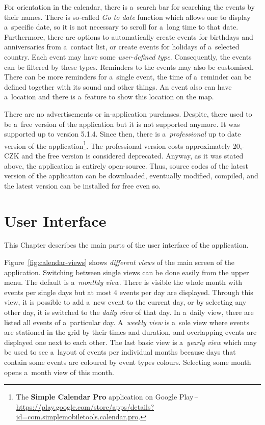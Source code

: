 \documentclass[a4paper, 11pt]{article}
\begin{document}
	For orientation in the calendar, there is a~search bar for searching
	the events by their names. There is so-called \emph{Go to date} function
	which allows one to display a~specific date, so it is not necessary
	to scroll for a~long time to that date. Furthermore, there are
	options to automatically create events for birthdays and anniversaries
	from a~contact list, or create events for holidays of a~selected
	country. Each event may have some \emph{user-defined type}. Consequently,
	the events can be filtered by these types. Reminders to the events
	may also be customised. There can be more reminders for a~single event,
	the time of a~reminder can be defined together with its sound and other
	things. An event also can have a~location and there is a~feature to show
	this location on the map.

	There are no advertisements or in-application purchases. Despite,
	there used to be a~free version of the application but it is not
	supported anymore. It was supported up to version 5.1.4. Since then,
	there is a~\emph{professional} up to date version of the
	application\footnote{%
		The \textbf{Simple Calendar Pro} application on Google Play\,--\,%
		\url{https://play.google.com/store/apps/details?id=com.simplemobiletools.calendar.pro}.
	}. The professional version costs approximately 20,- CZK and the free
	version is considered deprecated. Anyway, as it was stated above,
	the application is entirely open-source. Thus, source codes of the
	latest version of the application can be downloaded, eventually modified,
	compiled, and the latest version can be installed for free even so.


	\section{User Interface}
	\label{sec:ui}

	This Chapter describes the main parts of the user interface of the
	application.

	Figure~\ref{fig:calendar-views} shows \emph{different views} of the 
	main screen of the application. Switching between single views can be
	done easily from the upper menu. The default is a~\emph{monthly view}.
	There is visible the whole month with events per single days but at 
	most 4 events per day are displayed. Through this view, it is possible 
	to add a~new event to the current day, or by selecting any other day, 
	it is switched to the \emph{daily view} of that day. In a~daily view,
	there are listed all events of a~particular day. A~\emph{weekly view} 
	is a~sole view where events are stationed in the grid by their times 
	and duration, and overlapping events are displayed one next to each 
	other. The last basic view is a~\emph{yearly view} which may be used to
	see a~layout of events per individual months because days that contain
	some events are coloured by event types colours. Selecting some month
	opens a~month view of this month.
\end{document}
